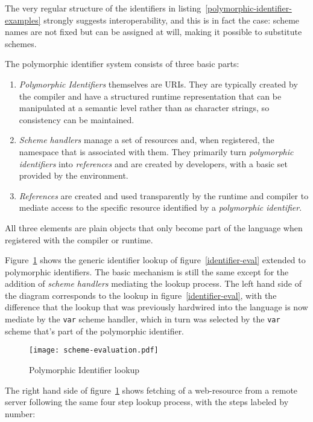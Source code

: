 \documentclass[preprint,authoryear]{acm_proc_article-sp}
\begin{document}
The very regular structure of the identifiers in listing~\ref{polymorphic-identifier-examples} strongly
suggests interoperability, and this is in fact the case:  scheme names are not fixed but can be
assigned at will, making it possible to substitute schemes.

The polymorphic identifier system consists of three basic parts:
\begin{enumerate}
\item {\em Polymorphic Identifiers} themselves are URIs.  They are typically created by the 
	compiler and have a structured runtime representation that can be manipulated
	at a semantic level rather than as character strings, so consistency can be 
	maintained.
\item {\em Scheme handlers} manage a set of resources and, when registered,
	 the namespace that is associated
	with them.  They primarily turn {\em polymorphic identifiers} into {\em references} and
	are created by developers, with a basic set provided by the environment.
\item {\em References} are created and used transparently by the runtime and compiler
	to mediate access to the specific resource identified by a {\em polymorphic identifier}.
	
	
\end{enumerate}

All three elements are plain objects that only become part of the language when registered
with the compiler or runtime.

Figure~\ref{scheme-eval} shows the generic identifier lookup of figure~\ref{identifier-eval}
extended to polymorphic identifiers.  The basic mechanism is still the same except for the
addition of {\em scheme handlers} mediating the lookup process.  The left hand side of the
diagram corresponds to the lookup in figure~\ref{identifier-eval}, with the difference that
the lookup that was previously hardwired into the language is now mediate by the {\tt var}
scheme handler, which in turn was selected by the {\tt var} scheme that's part of the 
polymorphic identifier.


\begin{figure}[htbp]
\label{scheme-eval}
\begin{center}
\texttt{[image: scheme-evaluation.pdf]}
\caption{Polymorphic Identifier lookup}
\end{center}
\end{figure}


The right hand side of figure~\ref{scheme-eval} shows fetching of a web-resource from
a remote server following the same four step lookup process, with the steps labeled by
number:
\end{document}
